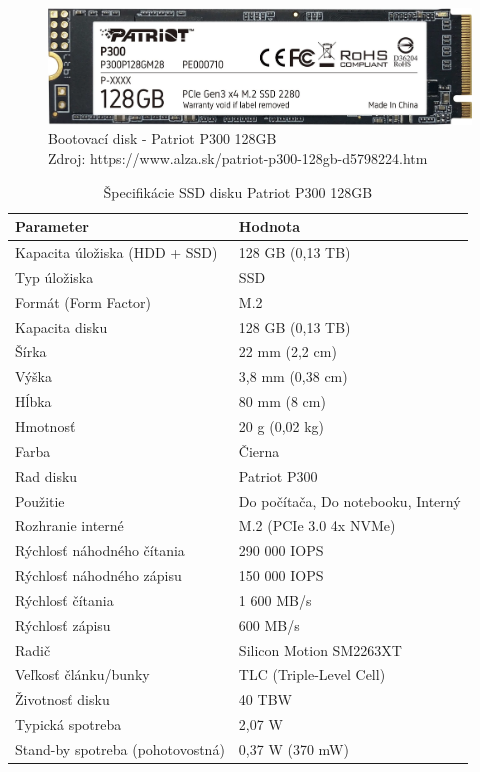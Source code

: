 \documentclass[12pt,oneside,slovak,a4paper]{article}
\begin{document}
\begin{figure}[H]
	\centering
	\captionsetup{justification=centering,margin=2cm}
	\includegraphics[scale=0.2]{./images/boot-drive.png} %
	\centering
	\caption{Bootovací disk - Patriot P300 128GB \\ Zdroj: https://www.alza.sk/patriot-p300-128gb-d5798224.htm}
\end{figure}

\begin{table}[h]
\centering
\begin{tabularx}{\textwidth}{|l|X|}
\hline
\textbf{Parameter} & \textbf{Hodnota} \\ \hline
Kapacita úložiska (HDD + SSD) & 128 GB (0,13 TB) \\ \hline
Typ úložiska & SSD \\ \hline
Formát (Form Factor) & M.2 \\ \hline
Kapacita disku & 128 GB (0,13 TB) \\ \hline
Šírka & 22 mm (2,2 cm) \\ \hline
Výška & 3,8 mm (0,38 cm) \\ \hline
Hĺbka & 80 mm (8 cm) \\ \hline
Hmotnosť & 20 g (0,02 kg) \\ \hline
Farba & Čierna \\ \hline
Rad disku & Patriot P300 \\ \hline
Použitie & Do počítača, Do notebooku, Interný \\ \hline
Rozhranie interné & M.2 (PCIe 3.0 4x NVMe) \\ \hline
Rýchlosť náhodného čítania & 290 000 IOPS \\ \hline
Rýchlosť náhodného zápisu & 150 000 IOPS \\ \hline
Rýchlosť čítania & 1 600 MB/s \\ \hline
Rýchlosť zápisu & 600 MB/s \\ \hline
Radič & Silicon Motion SM2263XT \\ \hline
Veľkosť článku/bunky & TLC (Triple-Level Cell) \\ \hline
Životnosť disku & 40 TBW \\ \hline
Typická spotreba & 2,07 W \\ \hline
Stand-by spotreba (pohotovostná) & 0,37 W (370 mW) \\ \hline
\end{tabularx}
\caption{Špecifikácie SSD disku Patriot P300 128GB}
\end{table}
\end{document}
